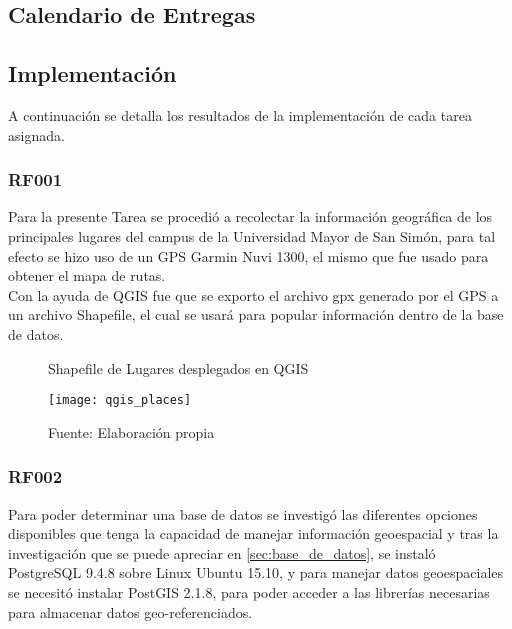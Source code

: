     


  \subsection{Calendario de Entregas}
  \label{subs:schedule_1}

    


\subsection{Implementación}
\label{sub:implementacion_iteracion_1}

  A continuación se detalla los resultados de la implementación de cada tarea asignada.

\subsubsection{RF001}
\label{subs:RF001}


Para la presente Tarea se procedió a recolectar la información geográfica de los principales lugares del campus de la Universidad Mayor de San Simón, para tal efecto se hizo uso
de un GPS Garmin Nuvi 1300, el mismo que fue usado  para obtener el mapa de rutas.\\

Con la ayuda de QGIS fue que se exporto el archivo gpx generado por el GPS a un archivo Shapefile, el cual se usará para popular información dentro de la base de datos.\\

\begin{figure}[H]
  \begin{center}
    \caption{Shapefile de Lugares desplegados en QGIS}
    \label{fig:qgis_places}
    \texttt{[image: qgis\_places]}
    \caption*{Fuente: Elaboración propia}
  \end{center}
\end{figure}

\subsubsection{RF002}
\label{subs:RF002}

Para poder determinar una base de datos se investigó las diferentes opciones disponibles que tenga la capacidad de manejar información geoespacial y tras la investigación que se puede apreciar en \ref{sec:base_de_datos}, se instaló PostgreSQL 9.4.8 sobre Linux Ubuntu 15.10, y para manejar datos geoespaciales se necesitó instalar PostGIS 2.1.8, para poder acceder a las librerías necesarias para almacenar datos geo-referenciados.\\

